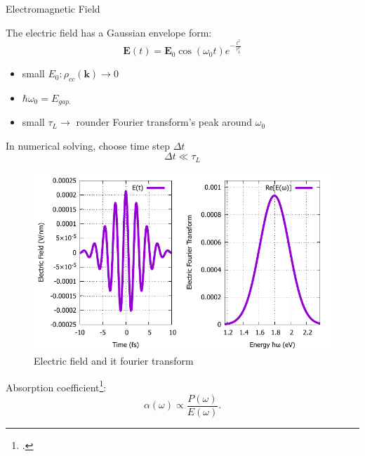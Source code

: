 \documentclass{beamer}
\begin{document}
\begin{frame}{Electromagnetic Field}
	\begin{multicols}{2}
		The electric field has a Gaussian envelope form:
		\begin{equation}
			\textbf{E}(t) = \textbf{E}_0 \cos(\omega_0 t)e^{-\frac{t^2}{\tau_L^2}}
		\end{equation}
		\begin{itemize}
			\item small $E_0: \rho_{cc}(\textbf{k}) \to 0$
			\item $\hbar \omega_0 = E_{gap.}$
			\item small $\tau_L \to $ rounder Fourier transform's peak around $\omega_0$
		\end{itemize}
In numerical solving, choose time step \(\Delta t\)
$$\Delta t \ll \tau_L$$
		\columnbreak
		\begin{figure}[hp]
			\captionsetup{justification=centering}	
			\includegraphics[width=1\linewidth]{images/Eat.pdf}
			\caption{Electric field and it fourier transform}
		\end{figure}
		Absorption coefficient\footcite{haug_quantum_2009}:
		\begin{equation}
			\alpha(\omega) \propto \frac{P(\omega)}{E(\omega)}.
		\end{equation}
	\end{multicols}
\end{frame}
\end{document}

